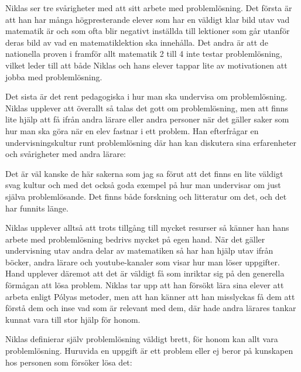 \textcolor{turkos}{
Niklas ser tre svårigheter med att sitt arbete med problemlösning. Det första är att han har många högpresterande elever som har en väldigt klar bild utav vad matematik är och som ofta blir negativt inställda till lektioner som går utanför deras bild av vad en matematiklektion ska innehålla. Det andra är att de nationella proven i framför allt matematik 2 till 4 inte testar problemlösning, vilket leder till att både Niklas och hans elever tappar lite av motivationen att jobba med problemlösning.}

\textcolor{turkos}{Det sista är det rent pedagogiska i hur man ska undervisa om problemlösning. Niklas upplever att överallt så talas det gott om problemlösning, men att finns lite hjälp att få ifrån andra lärare eller andra personer när det gäller saker som hur man ska göra när en elev fastnar i ett problem. Han efterfrågar en undervisningskultur runt problemlösning där han kan diskutera sina erfarenheter och svårigheter med andra lärare: 
}

\begin{displayquote}
\textcolor{turkos}{Det är väl kanske de här sakerna som jag sa förut att det finns en lite väldigt svag kultur och med det också goda exempel på hur man undervisar om just själva problemlösande. Det finns både forskning och litteratur om det, och det har funnits länge.}
\end{displayquote}

\textcolor{turkos}{
Niklas upplever alltså att trots tillgång till mycket resurser så känner han hans arbete med problemlösning bedrivs mycket på egen hand. När det gäller undervisning utav andra delar av matematiken så har han hjälp utav ifrån böcker, andra lärare och youtube-kanaler som visar hur man löser uppgifter. Hand upplever däremot att det är väldigt få som inriktar sig på den generella förmågan att lösa problem. Niklas tar upp att han försökt lära sina elever att arbeta enligt Pólyas metoder, men att han känner att han misslyckas få dem att förstå dem och inse vad som är relevant med dem, där hade andra lärares tankar kunnat vara till stor hjälp för honom. 
}

\textcolor{turkos}{
Niklas definierar själv problemlösning väldigt brett, för honom kan allt vara problemlösning. Huruvida en uppgift är ett problem eller ej beror på kunskapen hos personen som försöker lösa det:
}


